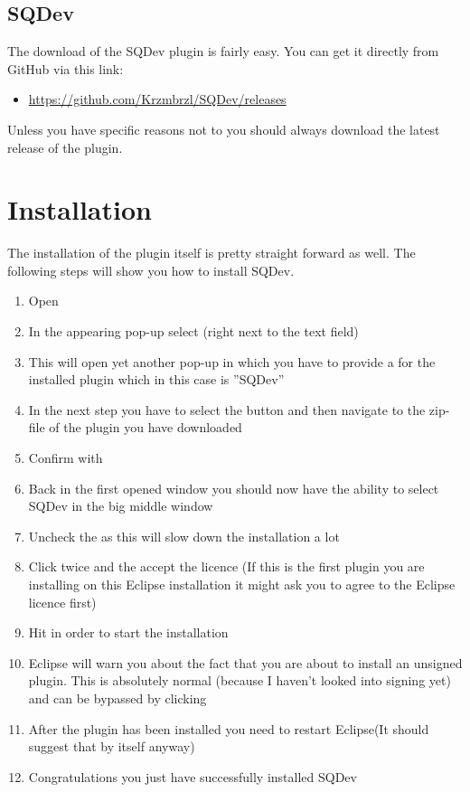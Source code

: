 \documentclass[twoside=false]{scrbook}
\newcommand{\SQDev}{SQDev\xspace}
\newcommand{\eclipse}{Eclipse\xspace}
\newcommand{\textInput}[1]{”#1”}
\begin{document}
	
	\subsection{\SQDev}
	The download of the \SQDev plugin is fairly easy. You can get it directly from GitHub via this link:
	\begin{itemize}
		\item \href{https://github.com/Krzmbrzl/SQDev/releases}{https://github.com/Krzmbrzl/SQDev/releases}
	\end{itemize}

	Unless you have specific reasons not to you should always download the latest release of the plugin.
	
	
	\section{Installation}
	The installation of the plugin itself is pretty straight forward as well. The following steps will show you how to install \SQDev.
	\begin{enumerate}
		\item Open 
		\item In the appearing pop-up select  (right next to the  text field)
		\item This will open yet another pop-up in which you have to provide a  for the installed plugin which in this case is \textInput{SQDev}
		\item In the next step you have to select the  button and then navigate to the zip-file of the plugin you have downloaded
		\item Confirm with 
		\item Back in the first opened window you should now have the ability to select \SQDev in the big middle window
		\item Uncheck the  as this will slow down the installation a lot
		\item Click  twice and the accept the licence (If this is the first plugin you are installing on this \eclipse installation it might ask you to agree to the \eclipse licence first)
		\item Hit  in order to start the installation
		\item Eclipse will warn you about the fact that you are about to install an unsigned plugin. This is absolutely normal (because I haven't looked into signing yet) and can be bypassed by clicking 
		\item After the plugin has been installed you need to restart \eclipse (It should suggest that by itself anyway)
		\item Congratulations you just have successfully installed \SQDev
	\end{enumerate}
	
\end{document}
